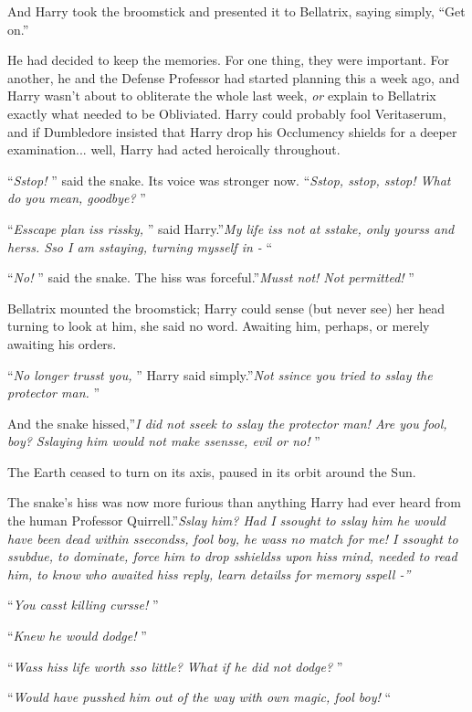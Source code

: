 And Harry took the broomstick and presented it to Bellatrix, saying
simply, ``Get on.''

He had decided to keep the memories. For one thing, they were important.
For another, he and the Defense Professor had started planning this a
week ago, and Harry wasn't about to obliterate the whole last week,
\emph{or} explain to Bellatrix exactly what needed to be Obliviated.
Harry could probably fool Veritaserum, and if Dumbledore insisted that
Harry drop his Occlumency shields for a deeper examination... well,
Harry had acted heroically throughout.

``\emph{Sstop!} '' said the snake. Its voice was stronger now.
``\emph{Sstop, sstop, sstop! What do you mean, goodbye?} ''

``\emph{Esscape plan iss rissky,} '' said Harry.''\emph{My life iss not at
sstake, only yourss and herss. Sso I am sstaying, turning mysself in -}
``

``\emph{No!} '' said the snake. The hiss was forceful.''\emph{Musst not!
Not permitted!} ''

Bellatrix mounted the broomstick; Harry could sense (but never see) her
head turning to look at him, she said no word. Awaiting him, perhaps, or
merely awaiting his orders.

``\emph{No longer trusst you,} '' Harry said simply.''\emph{Not ssince you
tried to sslay the protector man.} ''

And the snake hissed,''\emph{I did not sseek to sslay the protector man!
Are you fool, boy? Sslaying him would not make ssensse, evil or no!} ''

The Earth ceased to turn on its axis, paused in its orbit around the
Sun.

The snake's hiss was now more furious than anything Harry had ever heard
from the human Professor Quirrell.''\emph{Sslay him? Had I ssought to
sslay him he would have been dead within ssecondss, fool boy, he wass no
match for me! I ssought to ssubdue, to dominate, force him to drop
sshieldss upon hiss mind, needed to read him, to know who awaited hiss
reply, learn detailss for memory sspell -''}

``\emph{You casst killing cursse!} ''

``\emph{Knew he would dodge!} ''

``\emph{Wass hiss life worth sso little? What if he did not dodge?} ''

``\emph{Would have pusshed him out of the way with own magic, fool boy!}
``

